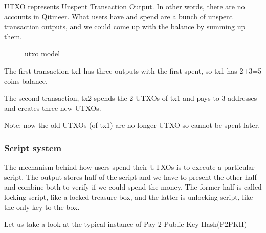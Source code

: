 \documentclass[a4paper,11pt]{article}
\begin{document}
UTXO represents Unspent Transaction Output. In other words, there are no accounts in Qitmeer. What users have and spend are a bunch of unspent transaction outputs, and we could come up with the balance by summing up them. 

\begin{figure}[hbt]
	\centerline{%
	}
\caption{utxo model}
\end{figure}

The first transaction tx1 has three outputs with the first spent, so  tx1 has 2+3=5 coins balance. 

The second transaction, tx2 spends the 2 UTXOs of tx1 and pays to 3 addresses and creates three new UTXOs. 

Note: now the old UTXOs (of tx1) are no longer UTXO so cannot be spent later.  

\subsubsection{Script system}

The mechanism behind how users spend their UTXOs is to execute a particular script. The output stores half of the script and we have to present the other half and combine both to verify if we could spend the money. The former half is called locking script, like a locked treasure box, and the latter is unlocking script, like the only key to the box.

Let us take a look at the typical instance of  Pay-2-Public-Key-Hash(P2PKH)
\end{document}
